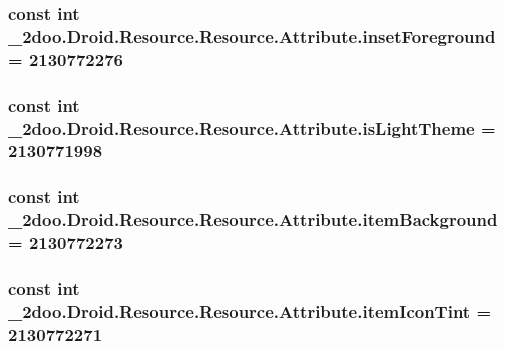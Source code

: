 \hypertarget{class__2doo_1_1_droid_1_1_resource_1_1_attribute_e260c5a877124db051e83f85db6beb5b}{
\subsubsection[{insetForeground}]{\setlength{\rightskip}{0pt plus 5cm}const int \_\-2doo.Droid.Resource.Resource.Attribute.insetForeground = 2130772276}}
\label{class__2doo_1_1_droid_1_1_resource_1_1_attribute_e260c5a877124db051e83f85db6beb5b}


\hypertarget{class__2doo_1_1_droid_1_1_resource_1_1_attribute_c57bff3937b051181bbeddad74fe7339}{
\subsubsection[{isLightTheme}]{\setlength{\rightskip}{0pt plus 5cm}const int \_\-2doo.Droid.Resource.Resource.Attribute.isLightTheme = 2130771998}}
\label{class__2doo_1_1_droid_1_1_resource_1_1_attribute_c57bff3937b051181bbeddad74fe7339}


\hypertarget{class__2doo_1_1_droid_1_1_resource_1_1_attribute_2c33a694b656db7d7f643537b2e95e16}{
\subsubsection[{itemBackground}]{\setlength{\rightskip}{0pt plus 5cm}const int \_\-2doo.Droid.Resource.Resource.Attribute.itemBackground = 2130772273}}
\label{class__2doo_1_1_droid_1_1_resource_1_1_attribute_2c33a694b656db7d7f643537b2e95e16}


\hypertarget{class__2doo_1_1_droid_1_1_resource_1_1_attribute_b1f606e84f650d67c4467144353c172b}{
\subsubsection[{itemIconTint}]{\setlength{\rightskip}{0pt plus 5cm}const int \_\-2doo.Droid.Resource.Resource.Attribute.itemIconTint = 2130772271}}
\label{class__2doo_1_1_droid_1_1_resource_1_1_attribute_b1f606e84f650d67c4467144353c172b}


